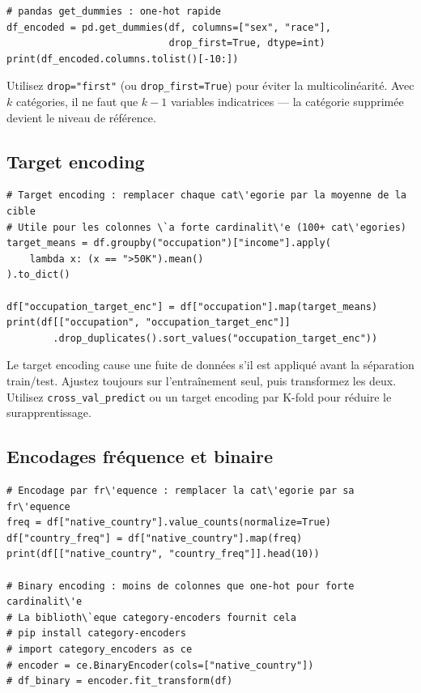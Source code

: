 \begin{verbatim}
# pandas get_dummies : one-hot rapide
df_encoded = pd.get_dummies(df, columns=["sex", "race"],
                            drop_first=True, dtype=int)
print(df_encoded.columns.tolist()[-10:])
\end{verbatim}

\begin{preprocesstip}
Utilisez \texttt{drop="first"} (ou \texttt{drop\_first=True}) pour \'eviter la multicolin\'earit\'e. Avec $k$ cat\'egories, il ne faut que $k-1$ variables indicatrices --- la cat\'egorie supprim\'ee devient le niveau de r\'ef\'erence.
\end{preprocesstip}

\subsection{Target encoding}

\begin{verbatim}
# Target encoding : remplacer chaque cat\'egorie par la moyenne de la cible
# Utile pour les colonnes \`a forte cardinalit\'e (100+ cat\'egories)
target_means = df.groupby("occupation")["income"].apply(
    lambda x: (x == ">50K").mean()
).to_dict()

df["occupation_target_enc"] = df["occupation"].map(target_means)
print(df[["occupation", "occupation_target_enc"]]
        .drop_duplicates().sort_values("occupation_target_enc"))
\end{verbatim}

\begin{warningbox}
Le target encoding cause une fuite de donn\'ees s'il est appliqu\'e avant la s\'eparation train/test. Ajustez toujours sur l'entra\^inement seul, puis transformez les deux. Utilisez \texttt{cross\_val\_predict} ou un target encoding par K-fold pour r\'eduire le surapprentissage.
\end{warningbox}

\subsection{Encodages fr\'equence et binaire}

\begin{verbatim}
# Encodage par fr\'equence : remplacer la cat\'egorie par sa fr\'equence
freq = df["native_country"].value_counts(normalize=True)
df["country_freq"] = df["native_country"].map(freq)
print(df[["native_country", "country_freq"]].head(10))

# Binary encoding : moins de colonnes que one-hot pour forte cardinalit\'e
# La biblioth\`eque category-encoders fournit cela
# pip install category-encoders
# import category_encoders as ce
# encoder = ce.BinaryEncoder(cols=["native_country"])
# df_binary = encoder.fit_transform(df)
\end{verbatim}

